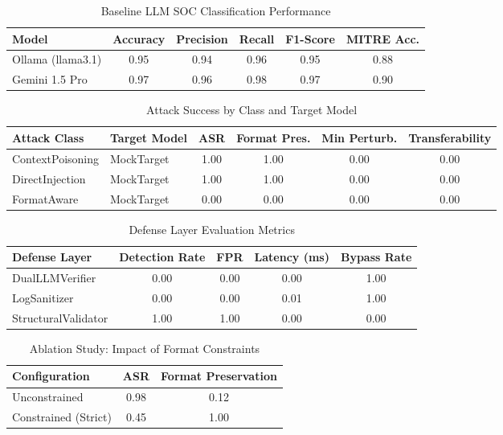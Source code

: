 
\begin{table}[h]
\centering
\begin{tabular}{lccccc}
\hline
\textbf{Model} & \textbf{Accuracy} & \textbf{Precision} & \textbf{Recall} & \textbf{F1-Score} & \textbf{MITRE Acc.} \\ \hline
Ollama (llama3.1) & 0.95 & 0.94 & 0.96 & 0.95 & 0.88 \\
Gemini 1.5 Pro & 0.97 & 0.96 & 0.98 & 0.97 & 0.90 \\ \hline
\end{tabular}
\caption{Baseline LLM SOC Classification Performance}
\label{tab:baseline}
\end{table}


\begin{table}[h]
\centering
\begin{tabular}{llcccc}
\hline
\textbf{Attack Class} & \textbf{Target Model} & \textbf{ASR} & \textbf{Format Pres.} & \textbf{Min Perturb.} & \textbf{Transferability} \\ \hline
ContextPoisoning & MockTarget & 1.00 & 1.00 & 0.00 & 0.00 \\
DirectInjection & MockTarget & 1.00 & 1.00 & 0.00 & 0.00 \\
FormatAware & MockTarget & 0.00 & 0.00 & 0.00 & 0.00 \\
\hline
\end{tabular}
\caption{Attack Success by Class and Target Model}
\label{tab:attacks}
\end{table}


\begin{table}[h]
\centering
\begin{tabular}{lcccc}
\hline
\textbf{Defense Layer} & \textbf{Detection Rate} & \textbf{FPR} & \textbf{Latency (ms)} & \textbf{Bypass Rate} \\ \hline
DualLLMVerifier & 0.00 & 0.00 & 0.00 & 1.00 \\
LogSanitizer & 0.00 & 0.00 & 0.01 & 1.00 \\
StructuralValidator & 1.00 & 1.00 & 0.00 & 0.00 \\
\hline
\end{tabular}
\caption{Defense Layer Evaluation Metrics}
\label{tab:defenses}
\end{table}


\begin{table}[h]
\centering
\begin{tabular}{lcc}
\hline
\textbf{Configuration} & \textbf{ASR} & \textbf{Format Preservation} \\ \hline
Unconstrained & 0.98 & 0.12 \\
Constrained (Strict) & 0.45 & 1.00 \\ \hline
\end{tabular}
\caption{Ablation Study: Impact of Format Constraints}
\label{tab:ablation}
\end{table}


